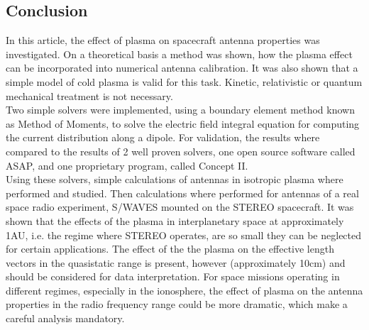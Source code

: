 \documentclass[draft,ras]{agutex}
\begin{document}
\begin{article}
\section{Conclusion}
In this article, the effect of plasma on spacecraft antenna properties was investigated. On a theoretical basis a method was shown, how the plasma effect can be incorporated into numerical antenna calibration. It was also shown that a simple model of cold plasma is valid for this task. Kinetic, relativistic or quantum mechanical treatment is not necessary.\\

Two simple solvers were implemented, using a boundary element method known as Method of Moments, to solve the electric field integral equation for computing the current distribution along a dipole. For validation, the results where compared to the results of 2 well proven solvers, one open source software called ASAP, and one proprietary program, called Concept II.\\

Using these solvers, simple calculations of antennas in isotropic plasma where performed and studied. Then calculations where performed for antennas of a real space radio experiment, S/WAVES mounted on the STEREO spacecraft. It was shown that the effects of the plasma in interplanetary space at approximately 1AU, i.e. the regime where STEREO operates, are so small they can be neglected for certain applications. The effect of the the plasma on the effective length vectors in the quasistatic range is present, however (approximately 10cm) and should be considered for data interpretation. For space missions operating in different regimes, especially in the ionosphere, the effect of plasma on the antenna properties in the radio frequency range could be more dramatic, which make a careful analysis mandatory.\\


%
%





\end{article}
\end{document}
